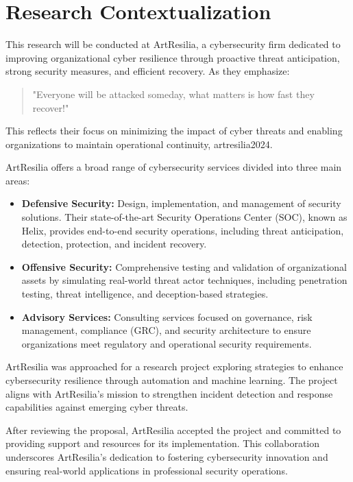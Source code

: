 \section{Research Contextualization}

This research will be conducted at ArtResilia, a cybersecurity firm dedicated to improving organizational cyber resilience through proactive threat anticipation, strong security measures, and efficient recovery.
As they emphasize: 

\begin{quote}
    "Everyone will be attacked someday, what matters is how fast they recover!"  
\end{quote}

This reflects their focus on minimizing the impact of cyber threats and enabling organizations to maintain operational continuity, artresilia2024.

ArtResilia offers a broad range of cybersecurity services divided into three main areas:
\begin{itemize}
    \item \textbf{Defensive Security:} Design, implementation, and management of security solutions. Their state-of-the-art Security Operations Center (SOC), known as Helix, provides end-to-end security operations, including threat anticipation, detection, protection, and incident recovery.
    \item \textbf{Offensive Security:} Comprehensive testing and validation of organizational assets by simulating real-world threat actor techniques, including penetration testing, threat intelligence, and deception-based strategies.
    \item \textbf{Advisory Services:} Consulting services focused on governance, risk management, compliance (GRC), and security architecture to ensure organizations meet regulatory and operational security requirements.
\end{itemize}

ArtResilia was approached for a research project exploring strategies to enhance cybersecurity resilience through automation and machine learning. The project aligns with ArtResilia's mission to strengthen incident detection and response capabilities against emerging cyber threats.

After reviewing the proposal, ArtResilia accepted the project and committed to providing support and resources for its implementation. This collaboration underscores ArtResilia's dedication to fostering cybersecurity innovation and ensuring real-world applications in professional security operations.

